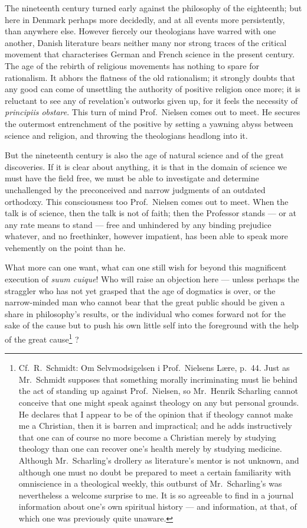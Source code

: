 \documentclass[12pt,a4paper]{book}
\renewcommand{\thefootnote}{*)}
\newcommand{\fnmark}[2]{\renewcommand{\thefootnote}{#1}\footnote{#2}%
  \renewcommand{\thefootnote}{*)}}
\newcommand{\opage}[1]{\marginnote{\footnotesize\textit{[#1]}}}
\begin{document}
The nineteenth century turned early against the philosophy of the eighteenth;
but here in Denmark perhaps more decidedly, and at all events more
persistently, than anywhere else. However fiercely our theologians have warred
with one another, Danish literature bears neither many nor strong traces of the
critical movement that characterises German and French science in the present
century. The age of the rebirth of religious movements has nothing to spare for
rationalism. It abhors the flatness of the old rationalism; it strongly doubts
that any good can come of unsettling the authority of positive religion once
more; it is reluctant to see any of revelation's outworks given up, for it
feels the necessity of \textit{principiis obstare}. This
\opage{11}turn of mind Prof.\ Nielsen comes out to meet. He secures the
outermost entrenchment of the positive by setting a yawning abyss between
science and religion, and throwing the theologians headlong into it.

But the nineteenth century is also the age of natural science and of the great
discoveries. If it is clear about anything, it is that in the domain of science
we must have the field free, we must be able to investigate and determine
unchallenged by the preconceived and narrow judgments of an outdated orthodoxy.
This consciousness too Prof.\ Nielsen comes out to meet. When the talk is of
science, then the talk is not of faith; then the Professor stands --- or at any
rate means to stand --- free and unhindered by any binding prejudice whatever,
and no freethinker, however impatient, has been able to speak more vehemently
on the point than he.

What more can one want, what can one still wish for beyond this magnificent
execution of \textit{suum cuique}! Who will raise an objection here --- unless
perhaps the straggler who has not yet grasped that the age of dogmatics is
over, or the narrow-minded man who cannot bear that the great public should be
given a share in philosophy's results, or the individual who comes forward not
for the sake of the cause but to push his own little self into the foreground
with the help of the great cause\fnmark{*)}{Cf.\ R.\ Schmidt: Om
Selvmodsigelsen i Prof.\ Nielsens Lære, p.\ 44.\endgraf
Just as Mr.\ Schmidt supposes that something morally incriminating must lie
behind the act of standing up against Prof.\ Nielsen, so Mr.\ Henrik Scharling
cannot conceive that one might speak against theology on any but personal
grounds. He declares that I appear to be of the opinion that if theology cannot
make me a Christian, then it is barren and impractical; and he adds
instructively that one can of course no more become a Christian merely by
studying theology than one can recover one's health merely by studying
medicine. Although Mr.\ Scharling's drollery as literature's mentor is not
unknown, and although one must no doubt be prepared to meet a certain
familiarity with omniscience in a theological weekly, this outburst of Mr.\
Scharling's was nevertheless a welcome surprise to me. It is so agreeable to
find in a journal information about one's own spiritual history --- and
information, at that, of which one was previously quite unaware.}?
\end{document}
